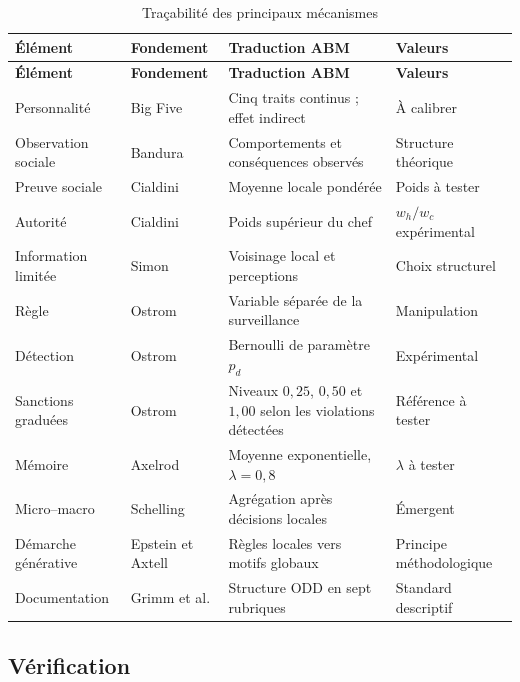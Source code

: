 \documentclass[11pt,a4paper]{article}
\begin{document}
\begin{longtable}{L{30mm}L{42mm}L{45mm}L{29mm}}
\caption{Traçabilité des principaux mécanismes}\label{tab:trace}\\
\toprule
{}
\color{white}\textbf{Élément} &
\color{white}\textbf{Fondement} &
\color{white}\textbf{Traduction ABM} &
\color{white}\textbf{Valeurs}\\
\midrule
\endfirsthead
\toprule
{}
\color{white}\textbf{Élément} &
\color{white}\textbf{Fondement} &
\color{white}\textbf{Traduction ABM} &
\color{white}\textbf{Valeurs}\\
\midrule
\endhead
Personnalité &
Big Five \cite{costa1992} &
Cinq traits continus ; effet indirect &
À calibrer\\
Observation sociale &
Bandura \cite{bandura1977} &
Comportements et conséquences observés &
Structure théorique\\
Preuve sociale &
Cialdini \cite{cialdini2009} &
Moyenne locale pondérée &
Poids à tester\\
Autorité &
Cialdini \cite{cialdini2009} &
Poids supérieur du chef &
$w_h/w_c$ expérimental\\
Information limitée &
Simon \cite{simon1997} &
Voisinage local et perceptions &
Choix structurel\\
Règle &
Ostrom \cite{ostrom1990} &
Variable séparée de la surveillance &
Manipulation\\
Détection &
Ostrom \cite{ostrom1990} &
Bernoulli de paramètre $p_d$ &
Expérimental\\
Sanctions graduées &
Ostrom \cite{ostrom1990} &
Niveaux $0{,}25$, $0{,}50$ et $1{,}00$ selon les violations détectées &
Référence à tester\\
Mémoire &
Axelrod \cite{axelrod2006} &
Moyenne exponentielle, $\lambda=0{,}8$ &
$\lambda$ à tester\\
Micro--macro &
Schelling \cite{schelling2006} &
Agrégation après décisions locales &
Émergent\\
Démarche générative &
Epstein et Axtell \cite{epstein1996} &
Règles locales vers motifs globaux &
Principe méthodologique\\
Documentation &
Grimm et al. \cite{grimm2020} &
Structure ODD en sept rubriques &
Standard descriptif\\
\bottomrule
\end{longtable}

\subsection{Vérification}
\end{document}
